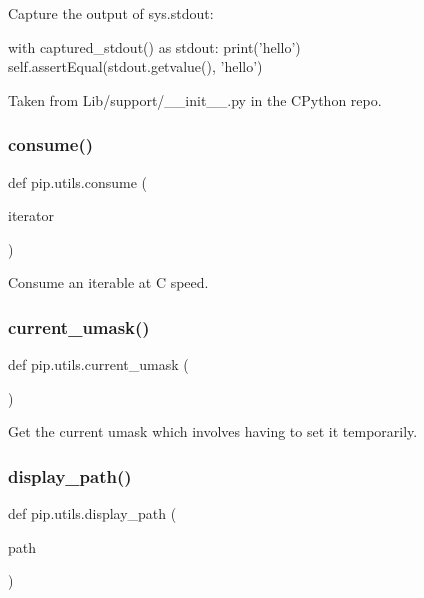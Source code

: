 \begin{DoxyVerb}Capture the output of sys.stdout:

   with captured_stdout() as stdout:
       print('hello')
   self.assertEqual(stdout.getvalue(), 'hello\n')

Taken from Lib/support/__init__.py in the CPython repo.
\end{DoxyVerb}
 \mbox{\label{namespacepip_1_1utils_abfc0be5e29ab3edb4efc97feee05a3e0}} 
\subsubsection{\texorpdfstring{consume()}{consume()}}
{\footnotesize\ttfamily def pip.\+utils.\+consume (\begin{DoxyParamCaption}\item[{}]{iterator }\end{DoxyParamCaption})}

\begin{DoxyVerb}Consume an iterable at C speed.\end{DoxyVerb}
 \mbox{\label{namespacepip_1_1utils_a931b19a4aa22cb6859279b00ade41735}} 
\subsubsection{\texorpdfstring{current\+\_\+umask()}{current\_umask()}}
{\footnotesize\ttfamily def pip.\+utils.\+current\+\_\+umask (\begin{DoxyParamCaption}{ }\end{DoxyParamCaption})}

\begin{DoxyVerb}Get the current umask which involves having to set it temporarily.\end{DoxyVerb}
 \mbox{\label{namespacepip_1_1utils_ad7ee11adc1c02ca35977269fd7515a63}} 
\subsubsection{\texorpdfstring{display\+\_\+path()}{display\_path()}}
{\footnotesize\ttfamily def pip.\+utils.\+display\+\_\+path (\begin{DoxyParamCaption}\item[{}]{path }\end{DoxyParamCaption})}

